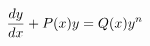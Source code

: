 \documentclass[preview]{standalone}
\begin{document}
\begin{align*}
\special{dvisvgm:raw <g id='unique000'>}\frac{dy}{dx} + P(x)y = Q(x)y^n\special{dvisvgm:raw </g>}
\end{align*}
\end{document}
